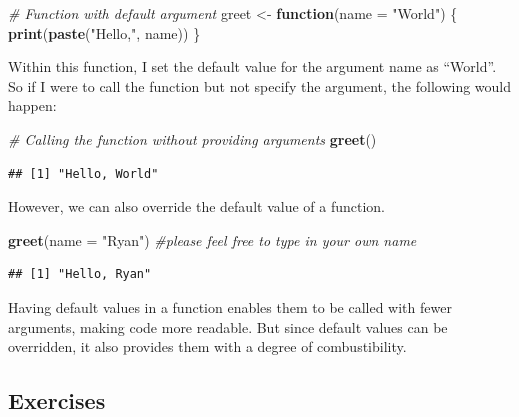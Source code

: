\documentclass[
]{book}
\newenvironment{Shaded}{\begin{snugshade}}{\end{snugshade}}
\newcommand{\AttributeTok}[1]{\textcolor[rgb]{0.13,0.29,0.53}{#1}}
\newcommand{\CommentTok}[1]{\textcolor[rgb]{0.56,0.35,0.01}{\textit{#1}}}
\newcommand{\ControlFlowTok}[1]{\textcolor[rgb]{0.13,0.29,0.53}{\textbf{#1}}}
\newcommand{\FunctionTok}[1]{\textcolor[rgb]{0.13,0.29,0.53}{\textbf{#1}}}
\newcommand{\NormalTok}[1]{#1}
\newcommand{\OtherTok}[1]{\textcolor[rgb]{0.56,0.35,0.01}{#1}}
\newcommand{\StringTok}[1]{\textcolor[rgb]{0.31,0.60,0.02}{#1}}
\begin{document}
\begin{Shaded}
\begin{Highlighting}[]
\CommentTok{\# Function with default argument}
\NormalTok{greet }\OtherTok{\textless{}{-}} \ControlFlowTok{function}\NormalTok{(}\AttributeTok{name =} \StringTok{"World"}\NormalTok{) \{}
  \FunctionTok{print}\NormalTok{(}\FunctionTok{paste}\NormalTok{(}\StringTok{"Hello,"}\NormalTok{, name))}
\NormalTok{\}}
\end{Highlighting}
\end{Shaded}

Within this function, I set the default value for the argument name as ``World''. So if I were to call the function but not specify the argument, the following would happen:

\begin{Shaded}
\begin{Highlighting}[]
\CommentTok{\# Calling the function without providing arguments}
\FunctionTok{greet}\NormalTok{() }
\end{Highlighting}
\end{Shaded}

\begin{verbatim}
## [1] "Hello, World"
\end{verbatim}

However, we can also override the default value of a function.

\begin{Shaded}
\begin{Highlighting}[]
\FunctionTok{greet}\NormalTok{(}\AttributeTok{name =} \StringTok{"Ryan"}\NormalTok{) }\CommentTok{\#please feel free to type in your own name}
\end{Highlighting}
\end{Shaded}

\begin{verbatim}
## [1] "Hello, Ryan"
\end{verbatim}

Having default values in a function enables them to be called with fewer arguments, making code more readable. But since default values can be overridden, it also provides them with a degree of combustibility.

\hypertarget{exercises-4}{%
\subsection{Exercises}\label{exercises-4}}
\end{document}

